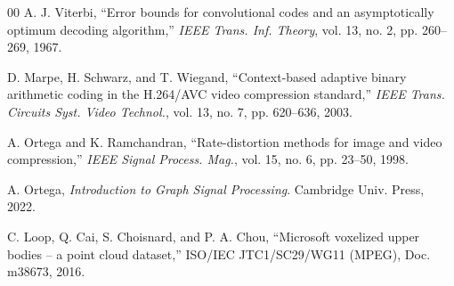 \documentclass[conference]{IEEEtran}
\begin{document}
\begin{thebibliography}{00}
A. J. Viterbi, ``Error bounds for convolutional codes and an asymptotically optimum decoding
algorithm,'' \emph{IEEE Trans. Inf. Theory}, vol. 13, no. 2, pp. 260--269, 1967.

D. Marpe, H. Schwarz, and T. Wiegand, ``Context-based adaptive binary arithmetic coding in the
H.264/AVC video compression standard,'' \emph{IEEE Trans. Circuits Syst. Video Technol.}, vol.
13, no. 7, pp. 620--636, 2003.

A. Ortega and K. Ramchandran, ``Rate-distortion methods for image and video compression,''
\emph{IEEE Signal Process. Mag.}, vol. 15, no. 6, pp. 23--50, 1998.

A. Ortega, \emph{Introduction to Graph Signal Processing}. Cambridge Univ. Press, 2022.

C. Loop, Q. Cai, S. Choisnard, and P. A. Chou, ``Microsoft voxelized upper bodies -- a point
cloud dataset,'' ISO/IEC JTC1/SC29/WG11 (MPEG), Doc. m38673, 2016.

\end{thebibliography}
\end{document}
